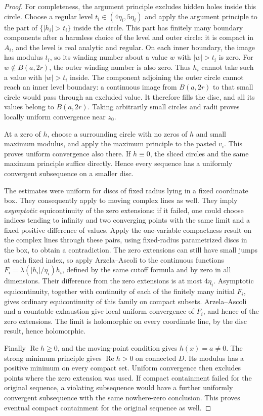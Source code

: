 \begin{proof}
For completeness, the argument principle excludes hidden holes inside this circle. Choose a regular level $t_i\in(4\eta_i,5\eta_i)$ and apply the argument principle to the part of $\{|h_i|>t_i\}$ inside the circle. This part has finitely many boundary components after a harmless choice of the level and outer circle: it is compact in $A_i$, and the level is real analytic and regular. On each inner boundary, the image has modulus $t_i$, so its winding number about a value $w$ with $|w|>t_i$ is zero. For $w\notin\overline{B(a,2r)}$, the outer winding number is also zero. Thus $h_i$ cannot take such a value with $|w|>t_i$ inside. The component adjoining the outer circle cannot reach an inner level boundary: a continuous image from $B(a,2r)$ to that small circle would pass through an excluded value. It therefore fills the disc, and all its values belong to $\overline{B(a,2r)}$. Taking arbitrarily small circles and radii proves locally uniform convergence near $z_0$.

At a zero of $h$, choose a surrounding circle with no zeros of $h$ and small maximum modulus, and apply the maximum principle to the pasted $v_i$. This proves uniform convergence also there. If $h\equiv0$, the sliced circles and the same maximum principle suffice directly. Hence every sequence has a uniformly convergent subsequence on a smaller disc.

The estimates were uniform for discs of fixed radius lying in a fixed coordinate box. They consequently apply to moving complex lines as well. They imply \emph{asymptotic} equicontinuity of the zero extensions: if it failed, one could choose indices tending to infinity and two converging points with the same limit and a fixed positive difference of values. Apply the one-variable compactness result on the complex lines through these pairs, using fixed-radius parametrized discs in the box, to obtain a contradiction. The zero extensions can still have small jumps at each fixed index, so apply Arzela--Ascoli to the continuous functions $F_i=\lambda(|h_i|/\eta_i)h_i$, defined by the same cutoff formula and by zero in all dimensions. Their difference from the zero extensions is at most $4\eta_i$. Asymptotic equicontinuity, together with continuity of each of the finitely many initial $F_i$, gives ordinary equicontinuity of this family on compact subsets. Arzela--Ascoli and a countable exhaustion give local uniform convergence of $F_i$, and hence of the zero extensions. The limit is holomorphic on every coordinate line, by the disc result, hence holomorphic.

Finally $\operatorname{Re}h\geq0$, and the moving-point condition gives $h(x)=a\ne0$. The strong minimum principle gives $\operatorname{Re}h>0$ on connected $D$. Its modulus has a positive minimum on every compact set. Uniform convergence then excludes points where the zero extension was used. If compact containment failed for the original sequence, a violating subsequence would have a further uniformly convergent subsequence with the same nowhere-zero conclusion. This proves eventual compact containment for the original sequence as well.
\end{proof}

